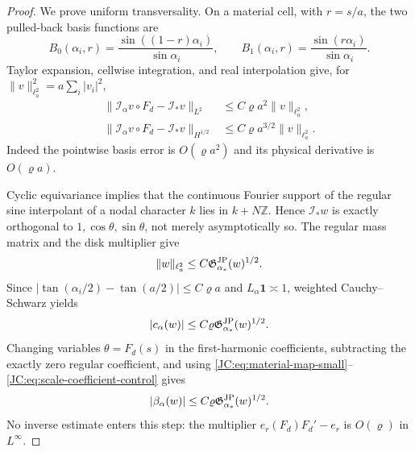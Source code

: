 \begin{proof}
We prove uniform transversality.  On a material cell, with $r=s/a$, the
two pulled-back basis functions are
\[
 B_0(\alpha_i,r)=\frac{\sin((1-r)\alpha_i)}{\sin\alpha_i},
 \qquad
 B_1(\alpha_i,r)=\frac{\sin(r\alpha_i)}{\sin\alpha_i}.
\]
Taylor expansion, cellwise integration, and real interpolation give, for
$\|v\|_{\ell_a^2}^2=a\sum_i|v_i|^2$,
\begin{align}
 \|\mathcal I_\alpha v\circ F_d-\mathcal I_*v\|_{L^2}
 &\le C\varrho a^2\|v\|_{\ell_a^2},\label{JC:eq:material-L2-error}\\
 \|\mathcal I_\alpha v\circ F_d-\mathcal I_*v\|_{H^{1/2}}
 &\le C\varrho a^{3/2}\|v\|_{\ell_a^2}.
 \label{JC:eq:material-Hhalf-error}
\end{align}
Indeed the pointwise basis error is $O(\varrho a^2)$ and its physical
derivative is $O(\varrho a)$.

Cyclic equivariance implies that the continuous Fourier support of the
regular sine interpolant of a nodal character $k$ lies in
$k+N\mathbb Z$.  Hence $\mathcal I_*w$ is exactly orthogonal to
$1,\cos\theta,\sin\theta$, not merely asymptotically so.  The regular
mass matrix and the disk multiplier give
\begin{equation}\label{JC:eq:regular-mass-G-control}
 \|w\|_{\ell_a^2}\le C\mathfrak G^{\rm JP}_{\alpha_*}(w)^{1/2}.
\end{equation}
Since
$|\tan(\alpha_i/2)-\tan(a/2)|\le C\varrho a$ and
$L_\alpha\mathbf1\asymp1$, weighted Cauchy--Schwarz yields
\begin{equation}\label{JC:eq:scale-coefficient-control}
 |c_\alpha(w)|\le C\varrho\mathfrak G^{\rm JP}_{\alpha_*}(w)^{1/2}.
\end{equation}
Changing variables $\theta=F_d(s)$ in the first-harmonic coefficients,
subtracting the exactly zero regular coefficient, and using
\eqref{JC:eq:material-map-small}--\eqref{JC:eq:scale-coefficient-control} gives
\begin{equation}\label{JC:eq:translation-coefficient-control}
 |\beta_\alpha(w)|\le C\varrho\mathfrak G^{\rm JP}_{\alpha_*}(w)^{1/2}.
\end{equation}
No inverse estimate enters this step: the multiplier
$e_r(F_d)F_d'-e_r$ is $O(\varrho)$ in $L^\infty$.


\end{proof}
